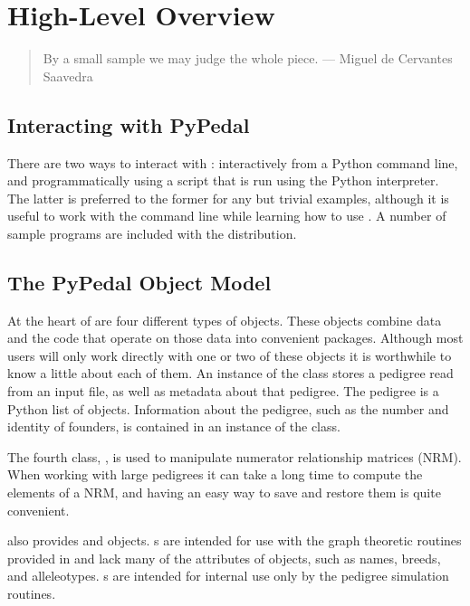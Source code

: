 \chapter{High-Level Overview}
\label{cha:high-level-overview}
\begin{quote}
By a small sample we may judge the whole piece. --- Miguel de Cervantes Saavedra
\end{quote}
\section{Interacting with PyPedal}
\label{sec:interacting}
There are two ways to interact with \PyPedal{}: interactively from a Python command line, and programmatically using a script that is run using the Python interpreter.  The latter is preferred to the former for any but trivial examples, although it is useful to work with the command line while learning how to use \PyPedal{}.  A number of sample programs are included with the \PyPedal{} distribution. %
\section{The PyPedal Object Model}
\label{sec:pypedal-objects}
At the heart of \PyPedal{} are four different types of objects.  These objects
combine data and the code that operate on those data into convenient packages.
Although most \PyPedal{} users will only work directly with one or two of these
objects it is worthwhile to know a little about each of them.  An instance of the
 class stores a pedigree read from an input file, as well as
metadata about that pedigree.  The pedigree is a Python list of 
objects.  Information about the pedigree, such as the number and identity of founders,
is contained in an instance of the  class.

The fourth \PyPedal{} class, , is used to manipulate numerator
relationship matrices (NRM).  When working with large pedigrees it can take a long
time to compute the elements of a NRM, and having an easy way to save and restore
them is quite convenient.

\PyPedal{} also provides  and  objects. s
are intended for use with the graph theoretic routines provided in  and lack
many of the attributes of  objects, such as names, breeds, and alleleotypes.
s are intended for internal use only by the pedigree simulation routines.

